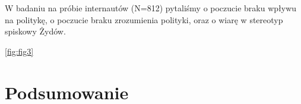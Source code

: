 \documentclass[man]{apa6}
\begin{document}
    W badaniu na próbie internautów (N=812) pytaliśmy o poczucie braku wpływu na politykę, o poczucie braku zrozumienia polityki, oraz o wiarę w stereotyp spiskowy Żydów.


    	\ref{fig:fig3}

	\begin{figure*}[htbp]
   		\centering
   		\caption{Relacja pomiędzy poczuciem politycznej bezsilność a antysemityzmem spiskowym w badaniu podłużnym z dwoma pomiarami (T1 i T2). Wartości na diagramie oznaczają współczynniki standaryzowane. \\
        *$p$ < 0,05 **$p$ < 0,01 ***$p$ < 0,001}
   		\label{fig:fig3}
	\end{figure*}


    \section{Podsumowanie}


\printbibliography
\end{document}
